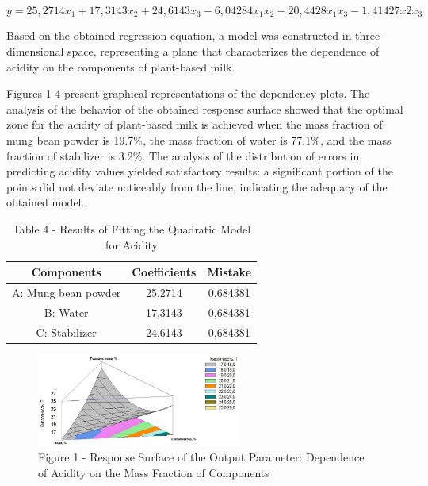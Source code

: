\begin{equation}
  y = 25,2714x_1 + 17,3143x_2+ 24,6143x_3- 6,04284x_1x_2- 20,4428x_1x_3- 1,41427x2x_3
  \end{equation}

  \begin{multicols}{2}

Based on the obtained regression equation, a model was constructed in
three-dimensional space, representing a plane that characterizes the
dependence of acidity on the components of plant-based milk.

Figures 1-4 present graphical representations of the dependency plots.
The analysis of the behavior of the obtained response surface showed
that the optimal zone for the acidity of plant-based milk is achieved
when the mass fraction of mung bean powder is 19.7\%, the mass fraction
of water is 77.1\%, and the mass fraction of stabilizer is 3.2\%. The
analysis of the distribution of errors in predicting acidity values
yielded satisfactory results: a significant portion of the points did
not deviate noticeably from the line, indicating the adequacy of the
obtained model.
\end{multicols}

\begin{table}[H]
\caption*{Table 4 - Results of Fitting the Quadratic Model for Acidity}
\centering
\begin{tabular}{|c|c|c|}
\hline
Components          & Coefficients & Mistake  \\ \hline
A: Mung bean powder & 25,2714      & 0,684381 \\ \hline
B: Water            & 17,3143      & 0,684381 \\ \hline
C: Stabilizer       & 24,6143      & 0,684381 \\ \hline
\end{tabular}
\end{table}







\begin{figure}[H]
	\centering
	\includegraphics[width=0.6\textwidth]{media/pish/image5}
	\caption*{Figure 1 - Response Surface of the Output Parameter: Dependence
of Acidity on the Mass Fraction of Components}
\end{figure}

